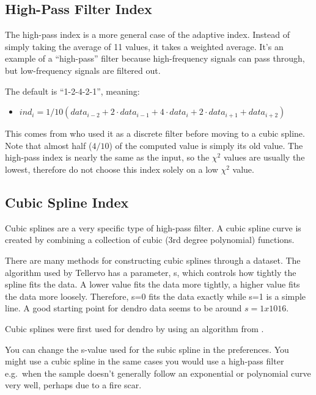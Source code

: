 \subsection{High-Pass Filter Index}
The high-pass index is a more general case of the adaptive index. Instead of simply taking the average of 11 values, it takes a weighted average. It's an example of a ``high-pass'' filter because high-frequency signals can pass through, but low-frequency signals are filtered out.

The default is ``1-2-4-2-1'', meaning:

\begin{itemize}
\item $ind_{i} = 1/10 (data_{i-2} + 2{\cdotp}data_{i-1} + 4{\cdotp}data_{i} +2{\cdotp}data_{i+1} + data_{i+2})$ 
\end{itemize}

This comes from \citet{Cook81} who used it as a discrete filter before moving to a cubic spline. Note that almost half ($4/10$) of the computed value is simply its old value. The high-pass index is nearly the same as the input, so the $\chi^2$ values are usually the lowest, therefore do not choose this index solely on a low $\chi^2$ value. 

\subsection{Cubic Spline Index}
Cubic splines are a very specific type of high-pass filter. A cubic spline curve is created by combining a collection of cubic (3rd degree polynomial) functions.

There are many methods for constructing cubic splines through a dataset. The algorithm used by Tellervo has a parameter, s, which controls how tightly the spline fits the data. A lower value fits the data more tightly, a higher value fits the data more loosely. Therefore, s=0 fits the data exactly while s=1 is a simple line. A good starting point for dendro data seems to be around $s=1x1016$.

Cubic splines were first used for dendro by \citet{Cook81} using an algorithm from \citet{Reinsch67}.

You can change the s-value used for the subic spline in the preferences. You might use a cubic spline in the same cases you would use a high-pass filter e.g.\ when the sample doesn't generally follow an exponential or polynomial curve very well, perhaps due to a fire scar. 

